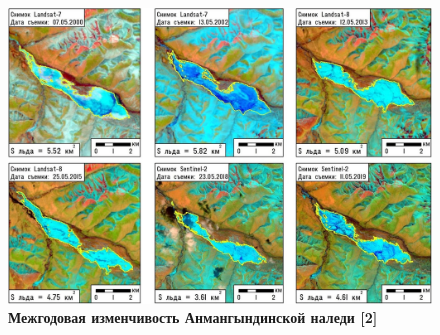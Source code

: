 \begin{figure}[h!]
\begin{changemargin}{-1.25cm}{0cm}
  \begin{center}
    \includegraphics[width=1.2\textwidth]{authors/zemlaykova-1-fig-1.jpg}
  \end{center}
\end{changemargin}
  \caption{\textbf{Межгодовая изменчивость Анмангындинской наледи [2]}}
  \label{fig:zemlaykova-1-fig-1}
\end{figure}
